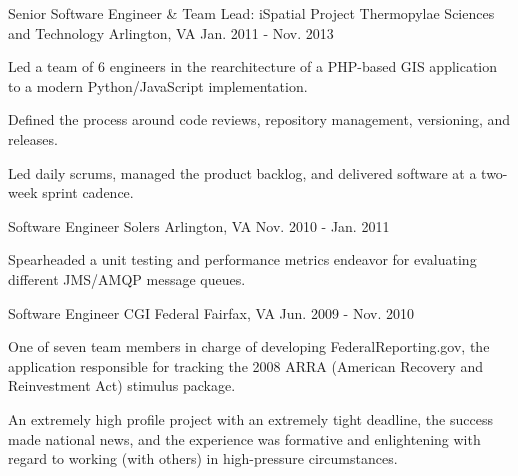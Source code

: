 \begin{cventries}
  \cventry
    {Senior Software Engineer \& Team Lead: iSpatial Project} %
    {Thermopylae Sciences and Technology} %
    {Arlington, VA} %
    {Jan. 2011 - Nov. 2013} %
    {
      \begin{cvitems} %
        \item {Led a team of 6 engineers in the rearchitecture of a PHP-based GIS application to a modern Python/JavaScript implementation.}
        \item {Defined the process around code reviews, repository management, versioning, and releases.}
        \item {Led daily scrums, managed the product backlog, and delivered software at a two-week sprint cadence.}
      \end{cvitems}
    }

  \cventry
    {Software Engineer} %
    {Solers} %
    {Arlington, VA} %
    {Nov. 2010 - Jan. 2011} %
    {
      \begin{cvitems} %
        \item {Spearheaded a unit testing and performance metrics endeavor for evaluating different JMS/AMQP message queues.}
      \end{cvitems}
    }

  \cventry
    {Software Engineer} %
    {CGI Federal} %
    {Fairfax, VA} %
    {Jun. 2009 - Nov. 2010} %
    {
      \begin{cvitems} %
        \item {One of seven team members in charge of developing FederalReporting.gov, the application responsible for tracking the 2008 ARRA (American Recovery and Reinvestment Act) stimulus package.}
        \item {An extremely high profile project with an extremely tight deadline, the success made national news, and the experience was formative and enlightening with regard to working (with others) in high-pressure circumstances.}
      \end{cvitems}
    }

\end{cventries}
